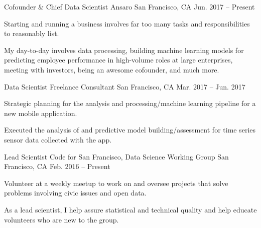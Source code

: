 
\begin{cventries}

  \cventry
    {Cofounder \& Chief Data Scientist} %
    {Ansaro} %
    {San Francisco, CA} %
    {Jun. 2017 -- Present} %
    {
      \begin{cvitems} %
        \item {Starting and running a business involves far too many tasks and responsibilities to reasonably list.}
        \item {My day-to-day involves data processing, building machine learning models for predicting employee performance in high-volume roles at large enterprises, meeting with investors, being an awesome cofounder, and much more.}
     \end{cvitems}
    }

  \cventry
    {Data Scientist} %
    {Freelance Consultant} %
    {San Francisco, CA} %
    {Mar. 2017 -- Jun. 2017} %
    {
      \begin{cvitems} %
        \item {Strategic planning for the analysis and processing/machine learning pipeline for a new mobile application.}
        \item {Executed the analysis of and predictive model building/assessment for time series sensor data collected with the app.}
     \end{cvitems}
    }

  \cventry
    {Lead Scientist} %
    {Code for San Francisco, Data Science Working Group} %
    {San Francisco, CA} %
    {Feb. 2016 -- Present} %
    {
      \begin{cvitems} %
        \item {Volunteer at a weekly meetup to work on and oversee projects that solve problems involving civic issues and open data.}
        \item {As a lead scientist, I help assure statistical and technical quality and help educate volunteers who are new to the group.}
      \end{cvitems}
    }


\end{cventries}
